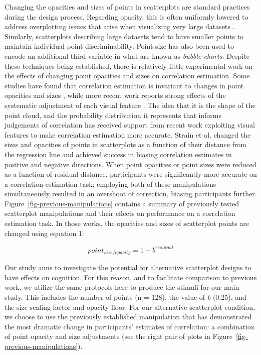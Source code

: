 \documentclass[manuscript,screen,review,anonymous]{acmart}
\begin{document}
Changing the opacities and sizes of points in scatterplots are standard
practices during the design process. Regarding opacity, this is often
uniformly lowered to address overplotting issues that arise when
visualizing very large datasets \citep{matejka_2015}. Similarly,
scatterplots describing large datasets tend to have smaller points to
maintain individual point discriminability. Point size has also been
used to encode an additional third variable in what are known as
\emph{bubble charts}. Despite these techniques being established, there
is relatively little experimental work on the effects of changing point
opacities and sizes on correlation estimation. Some studies have found
that correlation estimation is invariant to changes in point opacities
and sizes \citep{rensink_2014, rensink_2017}, while more recent work
reports strong effects of the systematic adjustment of each visual
feature \citep{strain_2023, strain_2023b, strain_2024}. The idea that it
is the shape of the point cloud, and the probability distribution it
represents that informs judgements of correlation has received support
from recent work exploiting visual features to make correlation
estimation more accurate. Strain et al.
\citep{strain_2023, strain_2023b, strain_2024} changed the sizes and
opacities of points in scatterplots as a function of their distance from
the regression line and achieved success in biasing correlation
estimates in positive and negative directions. When point opacities
\citep{strain_2023} or point sizes \citep{strain_2023b} were reduced as
a function of residual distance, participants were significantly more
accurate on a correlation estimation task; employing both of these
manipulations simultaneously \citep{strain_2024} resulted in an
overshoot of correction, biasing participants further.
Figure~\ref{fig-previous-manipulations} contains a summary of previously
tested scatterplot manipulations and their effects on performance on a
correlation estimation task. In those works, the opacities and sizes of
scatterplot points are changed using equation 1:

\begin{equation}
  point_{size/opacity} = 1 - b^{residual}
\end{equation}

Our study aims to investigate the potential for alternative scatterplot
designs to have effects on cognition. For this reason, and to facilitate
comparison to previous work, we utilize the same protocols here to
produce the stimuli for our main study. This includes the number of
points (n = 128), the value of \emph{b} (0.25), and the size scaling
factor and opacity floor. For our alternative scatterplot condition, we
choose to use the previously established manipulation that has
demonstrated the most dramatic change in participants' estimates of
correlation: a combination of point opacity and size adjustments
\citep{strain_2024} (see the right pair of plots in
Figure~\ref{fig-previous-manipulations}).
\end{document}
